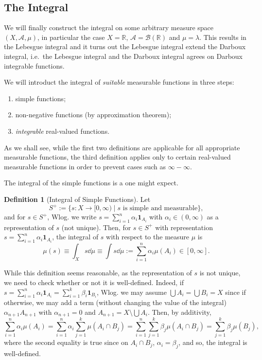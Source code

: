 \documentclass[
]{article}
\theoremstyle{definition}
\theoremstyle{definition}
\newtheorem{definition}{Definition}[section]
\begin{document}
\hypertarget{the-integral}{%
\subsection{The Integral}\label{the-integral}}

We will finally construct the integral on some arbitrary measure space
\((X, \mathcal{A}, \mu)\), in particular the case \(X = \mathbb{R}\),
\(\mathcal{A} = \mathcal{B}(\mathbb{R})\) and \(\mu = \lambda\). This
results in the Lebesgue integral and it turns out the Lebesgue integral
extend the Darboux integral, i.e.~the Lebesgue integral and the Darboux
integral agrees on Darboux integrable functions.

We will introduct the integral of \emph{suitable} measurable functions
in three steps:

\begin{enumerate}
  \item simple functions;
  \item non-negative functions (by approximation theorem);
  \item \textit{integrable} real-valued functions.
\end{enumerate}

As we shall see, while the first two definitions are applicable for all
appropriate measurable functions, the third definition applies only to
certain real-valued measurable functions in order to prevent cases such
as \(\infty - \infty\).

The integral of the simple functions is a one might expect.

\begin{definition}[Integral of Simple Functions]
  Let 
  \[S^+ := \{s : X \to [0, \infty) \mid s \text{ is simple and measurable}\},\]
  and for \(s \in S^+\), Wlog. we write \(s = \sum_{i = 1}^n \alpha_i \mathbf{1}_{A_i}\) 
  with \(\alpha_i \in (0, \infty)\) as a representation of \(s\) (not unique). 
  Then, for \(s \in S^+\) with representation \(s = \sum_{i = 1}^n \alpha_i \mathbf{1}_{A_i}\), 
  the integral of \(s\) with respect to the measure \(\mu\) is 
  \[\mu(s) \equiv \int_X s \dd \mu \equiv \int s \dd \mu := 
    \sum_{i = 1}^n \alpha_i \mu(A_i) \in [0, \infty].\]
\end{definition}

While this definition seems reasonable, as the representation of \(s\)
is not unique, we need to check whether or not it is well-defined.
Indeed, if
\(s = \sum_{i = 1}^n \alpha_i \mathbf{1}_{A_i} = \sum_{i = 1}^k \beta_i \mathbf{1}_{B_i}\),
Wlog. we may assume \(\bigcup A_i = \bigcup B_i = X\) since if
otherwise, we may add a term (without changing the value of the
integral) \(\alpha_{n + 1} A_{n + 1}\) with \(\alpha_{n + 1} = 0\) and
\(A_{n + 1} = X \setminus \bigcup A_i\). Then, by additivity,
\[\sum_{i = 1}^n\alpha_i \mu(A_i) = \sum_{i = 1}^n \alpha_i \sum_{j = 1}^k \mu(A_i \cap B_j) 
= \sum_{i = 1}^n \sum_{j = 1}^k \beta_j \mu(A_i \cap B_j) = \sum_{j = 1}^k \beta_j \mu(B_j),\]
where the second equality is true since on \(A_i \cap B_j\),
\(\alpha_i = \beta_j\), and so, the integral is well-defined.
\end{document}
